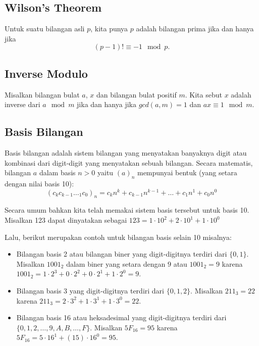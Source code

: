 \subsection{Wilson's Theorem}
Untuk suatu bilangan asli $p$, kita punya $p$ adalah bilangan prima jika dan hanya jika
$$(p-1)! \equiv -1 \mod p.$$

\subsection{Inverse Modulo}
Misalkan bilangan bulat $a$, $x$ dan bilangan bulat positif $m$. Kita sebut $x$ adalah inverse dari $a \mod m$ jika dan hanya jika $gcd(a,m)=1$ dan $ax \equiv 1 \mod m$.
\subsection{Basis Bilangan}
Basis bilangan adalah sistem bilangan yang menyatakan banyaknya digit atau kombinasi dari digit-digit yang menyatakan sebuah bilangan. Secara matematis, bilangan $a$ dalam basis $n > 0$ yaitu $(a)_n$ mempunyai bentuk (yang setara dengan nilai basis 10):
$$(c_kc_{k-1}\dotsc_1c_0)_n = c_{k}n^k + c_{k-1}n^{k-1}+\dots+c_1n^{1}+c_0n^{0}$$

Secara umum bahkan kita telah memakai sistem basis tersebut untuk basis 10. Misalkan 123 dapat dinyatakan sebagai $123 = 1\cdot 10^2 + 2\cdot 10^1 + 1\cdot 10^0$

Lalu, berikut merupakan contoh untuk bilangan basis selain 10 misalnya: 
\begin{itemize}
    \item Bilangan basis 2 atau bilangan biner yang digit-digitnya terdiri dari $\{0,1\}$. Misalkan $1001_2$ dalam biner yang setara dengan $9$ atau $1001_2 = 9$ karena $1001_2 = 1\cdot 2^3+0\cdot 2^2+0\cdot 2^1+1\cdot 2^0 = 9$. 
    \item Bilangan basis 3 yang digit-digitnya terdiri dari $\{0,1,2\}$. Misalkan $211_3 = 22$ karena $211_3 = 2\cdot 3^2+ 1\cdot 3^1+ 1\cdot 3^0 = 22$.
    \item Bilangan basis 16 atau heksadesimal yang digit-digitnya terdiri dari $\{0,1,2,\dots,9,A,B,\dots,F\}$. Misalkan $5F_{16} = 95$ karena $5F_{16} = 5 \cdot 16^1 + (15)\cdot 16^0 = 95$.
\end{itemize}

